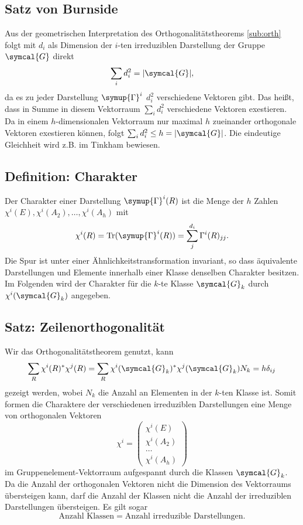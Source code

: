 \documentclass[
  captions=tableheading,  %
  titlepage=firstiscover, %
]{scrartcl}
\begin{document}
\subsection{Satz von Burnside}
Aus der geometrischen Interpretation des Orthogonalitätstheorems \ref{sub:orth} folgt 
mit $d_i$ als Dimension der $i$-ten irreduziblen Darstellung der Gruppe $\symcal{G}$ direkt
\begin{equation*}
  \sum_i d_i^2 = |\symcal{G}|,
\end{equation*}
da es zu jeder Darstellung $\symup{\Gamma}^i$ $d_i^2$ verschiedene Vektoren gibt. 
Das heißt, dass in Summe in diesem Vektorraum $\sum_i d_i^2$ verschiedene Vektoren exestieren.
Da in einem $h$-dimensionalen Vektorraum nur maximal $h$ zueinander orthogonale Vektoren exestieren können,
folgt $\sum_i d_i^2 \leq h = |\symcal{G}|$. 
Die eindeutige Gleichheit wird z.B. im Tinkham bewiesen.
\subsection{Definition: Charakter}
Der Charakter einer Darstellung $\symup{\Gamma}^i(R)$ ist die Menge
der $h$ Zahlen $\chi^i(E), \chi^i(A_2), \ldots, \chi^i(A_h)$ mit
\begin{equation*}
  \chi^i(R) = \text{Tr}(\symup{\Gamma}^i(R)) = \sum_j^{d_i} \Gamma^i(R)_{jj}.
\end{equation*}
Die Spur ist unter einer Ähnlichkeitstransformation invariant, so dass äquivalente Darstellungen und 
Elemente innerhalb einer Klasse denselben Charakter besitzen.
Im Folgenden wird der Charakter für die $k$-te Klasse $\symcal{G}_k$ durch $\chi^i(\symcal{G}_k)$ angegeben.
\subsection{Satz: Zeilenorthogonalität}
Wir das Orthogonalitätstheorem genutzt, kann 
\begin{equation*}
  \sum_R \chi^i(R)^* \chi^j(R) = \sum_R \chi^i(\symcal{G}_k)^* \chi^j(\symcal{G}_k) N_k = h \delta_{ij}
\end{equation*}
gezeigt werden, wobei $N_k$ die Anzahl an Elementen in der $k$-ten Klasse ist.
Somit formen die Charaktere der verschiedenen irreduziblen Darstellungen eine Menge von orthogonalen Vektoren 
\begin{equation*}
\chi^i = 
\begin{pmatrix}
  \chi^i(E       )\\
  \chi^i(A_2     )\\
  \ldots          \\
  \chi^i(A_h     )
\end{pmatrix}
\end{equation*}  
im Gruppenelement-Vektorraum aufgespannt durch die Klassen $\symcal{G}_k$.
Da die Anzahl der orthogonalen Vektoren nicht die Dimension des Vektorraums übersteigen kann,
darf die Anzahl der Klassen nicht die Anzahl der irreduziblen Darstellungen übersteigen.
Es gilt sogar
\begin{equation*}
  \text{Anzahl Klassen} = \text{Anzahl irreduzible Darstellungen}.
\end{equation*}
\end{document}
